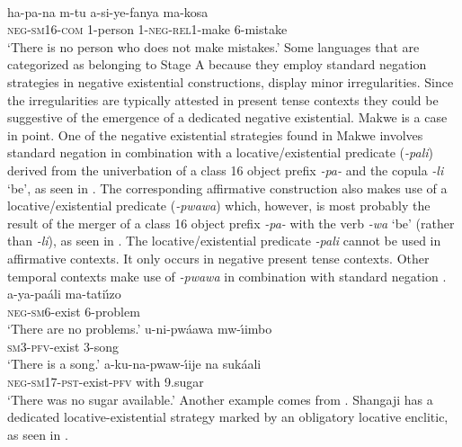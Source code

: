 \documentclass[output=paper]{langsci/langscibook}
\begin{document}
\ea\label{ex:swahili-mistake} \\ \gll ha-pa-na m-tu a-si-ye-fanya ma-kosa\\
\textsc{neg}-\textsc{sm}16-\textsc{com} 1-person
1-\textsc{neg}-\textsc{rel}1-make 6-mistake\\ \glt `There is no person who
does not make mistakes.' \z 
%
Some languages that are categorized as
belonging to Stage A because they employ standard negation strategies in
negative existential constructions, display minor irregularities. Since the
irregularities are typically attested in present tense contexts they could
be suggestive of the emergence of a dedicated negative existential.
Makwe is a case in point. One of the negative existential
strategies found in Makwe involves standard negation in combination with a
locative\slash existential predicate (\textit{-pali}) derived from the
univerbation of a class 16 object prefix \textit{-pa-} and the copula
\textit{-li} `be', as seen in .  The corresponding
affirmative construction also makes use of a locative\slash existential
predicate (\textit{-pwawa}) which, however, is most probably the result of
the merger of a class 16 object prefix \textit{-pa-} with the verb
\textit{-wa} `be' (rather than \textit{-li}), as seen in
.  The locative\slash existential predicate
\textit{-pali} cannot be used in affirmative contexts. It only occurs in
negative present tense contexts. Other temporal contexts make use of
\textit{-pwawa} in combination with standard negation .
%
\ea\label{ex:makwe-problem-song-sugar}  
\ea\label{ex:makwe-problem}
\gll a-ya-pa{\'a}li ma-tati{\'\i}zo\\ \textsc{neg-sm}6-exist 6-problem\\
\glt `There are no problems.' 
\ex\label{ex:makwe-song} \gll u-ni-pw{\'a}awa
mw-{\'\i}imbo\\ \textsc{sm3-pfv}{}-exist  3-song\\ \glt `There is a song.'
\ex\label{ex:makwe-sugar} \gll a-ku-na-pwaw-{\'\i}ije na suk{\'a}ali\\
\textsc{neg-sm17-pst}-exist-\textsc{pfv} with 9.sugar\\ \glt `There was no
sugar available.' \z\z 
%
Another example comes from . Shangaji
has a dedicated locative-ex\-is\-ten\-tial strategy marked by an obligatory
locative enclitic, as seen in . 
\end{document}
